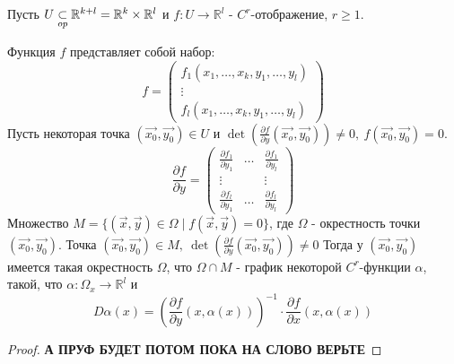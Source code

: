 \begin{theorem}
    Пусть $U \underset{op}{\subset} \mathbb{R}^{k+l} = \mathbb{R}^k \times \mathbb{R}^l$ и $f: U \to \mathbb{R}^l$ - $C^r$-отображение, $r \geq 1$.

    Функция $f$ представляет собой набор:
    \[f = \begin{pmatrix}{}
        f_1(x_1, \hdots, x_k, y_1, \hdots, y_l) \\
        \vdots \\
        f_l(x_1, \hdots, x_k, y_1, \hdots, y_l)
    \end{pmatrix}\]
    Пусть некоторая точка $(\overrightarrow{x_0}, \overrightarrow{y_0}) \in U$ и $\det(\frac{\partial f}{\partial y}(\overrightarrow{x_o}, \overrightarrow{y_0})) \neq 0, \ f(\overrightarrow{x_0}, \overrightarrow{y_0}) = 0$.
    \[\frac{\partial f}{\partial y} = \begin{pmatrix}
        \frac{\partial f_1}{\partial y_1} & \hdots & \frac{\partial f_1}{\partial y_l} \\
        \vdots & & \vdots \\
        \frac{\partial f_l}{\partial y_1} & \hdots & \frac{\partial f_l}{\partial y_l}
    \end{pmatrix}\]
    Множество $M = \{(\overrightarrow{x},\overrightarrow{y}) \in \Omega \mid f(\overrightarrow{x}, \overrightarrow{y}) = 0\}$, где $\Omega$ - окрестность точки $(\overrightarrow{x_0}, \overrightarrow{y_0})$.
    Точка $(\overrightarrow{x_0}, \overrightarrow{y_0}) \in M, \ \det(\frac{\partial f}{\partial y}(\overrightarrow{x_0}, \overrightarrow{y_0})) \neq 0$
    \newline
    Тогда у $(\overrightarrow{x_0}, \overrightarrow{y_0})$ имеется такая окрестность $\Omega$, что $\Omega \cap M$ - график некоторой $C^r$-функции $\alpha$, такой, что $\alpha: \Omega_x \to \mathbb{R}^l$ и 
    \[D\alpha(x) = (\frac{\partial f}{\partial y}(x, \alpha(x)))^{-1} \cdot \frac{\partial f}{\partial x}(x, \alpha(x))\]
    \begin{proof}
        \textbf{А ПРУФ БУДЕТ ПОТОМ ПОКА НА СЛОВО ВЕРЬТЕ}
    \end{proof}
\end{theorem}
